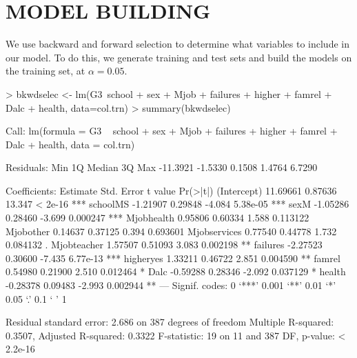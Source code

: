 \documentclass{article}
\begin{document}
\section{MODEL BUILDING}
We use backward and forward selection to determine what variables to include in our model. To do this, we generate training and test sets and build the models on the training set, at $\alpha = 0.05$. 




\begin{Schunk}
\begin{Sinput}
> bkwdselec <- lm(G3~school + sex + Mjob + failures + higher + famrel + Dalc + health, data=col.trn)
> summary(bkwdselec)
\end{Sinput}
\begin{Soutput}
Call:
lm(formula = G3 ~ school + sex + Mjob + failures + higher + famrel + 
    Dalc + health, data = col.trn)

Residuals:
     Min       1Q   Median       3Q      Max 
-11.3921  -1.5330   0.1508   1.4764   6.7290 

Coefficients:
             Estimate Std. Error t value Pr(>|t|)    
(Intercept)  11.69661    0.87636  13.347  < 2e-16 ***
schoolMS     -1.21907    0.29848  -4.084 5.38e-05 ***
sexM         -1.05286    0.28460  -3.699 0.000247 ***
Mjobhealth    0.95806    0.60334   1.588 0.113122    
Mjobother     0.14637    0.37125   0.394 0.693601    
Mjobservices  0.77540    0.44778   1.732 0.084132 .  
Mjobteacher   1.57507    0.51093   3.083 0.002198 ** 
failures     -2.27523    0.30600  -7.435 6.77e-13 ***
higheryes     1.33211    0.46722   2.851 0.004590 ** 
famrel        0.54980    0.21900   2.510 0.012464 *  
Dalc         -0.59288    0.28346  -2.092 0.037129 *  
health       -0.28378    0.09483  -2.993 0.002944 ** 
---
Signif. codes:  0 ‘***’ 0.001 ‘**’ 0.01 ‘*’ 0.05 ‘.’ 0.1 ‘ ’ 1

Residual standard error: 2.686 on 387 degrees of freedom
Multiple R-squared:  0.3507,	Adjusted R-squared:  0.3322 
F-statistic:    19 on 11 and 387 DF,  p-value: < 2.2e-16
\end{Soutput}
\end{Schunk}


\end{document}
